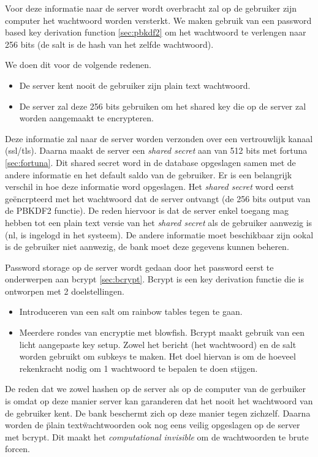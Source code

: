 \documentclass[11pt]{article}
\begin{document}
Voor deze informatie naar de server wordt overbracht zal op de gebruiker zijn computer het wachtwoord worden versterkt. We maken gebruik van een password based key derivation function \ref{sec:pbkdf2} om het wachtwoord te verlengen naar 256 bits (de salt is de hash van het zelfde wachtwoord). 

We doen dit voor de volgende redenen.
\begin{itemize}
\item De server kent nooit de gebruiker zijn plain text wachtwoord. 
\item De server zal deze 256 bits gebruiken om het shared key die op de server zal worden aangemaakt te encrypteren.
\end{itemize}

Deze informatie zal naar de server worden verzonden over een vertrouwlijk kanaal (ssl/tls). 
Daarna maakt de server een \emph{shared secret} aan van 512 bits met fortuna \ref{sec:fortuna}. Dit shared secret word in de database opgeslagen samen met de andere informatie en het default saldo van de gebruiker. Er is een belangrijk verschil in hoe deze informatie word opgeslagen. Het \emph{shared secret} word eerst ge\"encrpteerd met het wachtwoord dat de server ontvangt (de 256 bits output van de PBKDF2 functie). De reden hiervoor is dat de server enkel toegang mag hebben tot een plain text versie van het \emph{shared secret} als de gebruiker aanwezig is (nl, is ingelogd in het systeem). De andere informatie moet beschikbaar zijn ookal is de gebruiker niet aanwezig, de bank moet deze gegevens kunnen beheren.

Password storage op de server wordt gedaan door het password eerst te onderwerpen aan bcrypt \ref{sec:bcrypt}. Bcrypt is een key derivation functie die is ontworpen met 2 doelstellingen.
\begin{itemize}
\item Introduceren van een salt om rainbow tables tegen te gaan.
\item Meerdere rondes van encryptie met blowfish. Bcrypt maakt gebruik van een licht aangepaste key setup. Zowel het bericht (het wachtwoord) en de salt worden gebruikt om subkeys te maken. Het doel hiervan is om de hoeveel rekenkracht nodig om 1 wachtwoord te bepalen te doen stijgen. 
\end{itemize}
De reden dat we zowel hashen op de server als op de computer van de gerbuiker is omdat op deze manier server kan garanderen dat het nooit het wachtwoord van de gebruiker kent. De bank beschermt zich op deze manier tegen zichzelf. Daarna worden de \"plain text\" wachtwoorden ook nog eens veilig opgeslagen op de server met bcrypt. Dit maakt het \emph{computational invisible} om de wachtwoorden te brute forcen.
\end{document}
